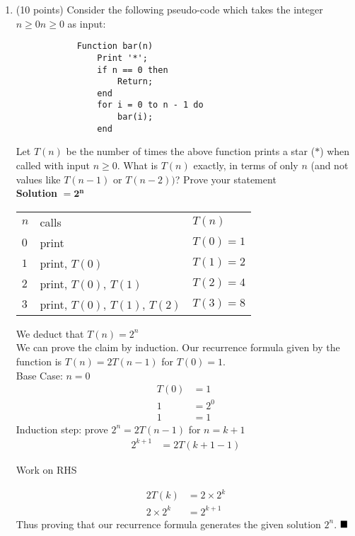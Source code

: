 \documentclass{article}
\begin{document}
    \begin{enumerate}[label=\textbf{Q2}]
        \item (10 points) Consider the following pseudo-code which takes the integer $n \geq 0n \geq 0$ as input:
        \begin{verbatim}
            Function bar(n)
                Print '*';
                if n == 0 then
                    Return;
                end
                for i = 0 to n - 1 do
                    bar(i);
                end
        \end{verbatim}
        Let $T(n)$ be the number of times the above function prints a star ($*$) when called with input $n \geq 0$.
        What is $T(n)$ exactly, in terms of only $n$ (and not values like $T(n - 1)$ or $T(n - 2))$? Prove your
        statement\\[0.25in]
        \textbf{Solution} $= \mathbf{2^n}$\\
        \begin{tabular}{l l l}
            $n$ & calls & $T(n)$\\
            $0$ & print & $T(0) = 1$\\
            $1$ & print, $T(0)$ & $T(1) = 2$\\
            $2$ & print, $T(0)$, $T(1)$ & $T(2) = 4$\\
            $3$ & print, $T(0)$, $T(1)$, $T(2)$ & $T(3) = 8$\\
        \end{tabular}

        We deduct that $T(n) = 2^n$\\
        We can prove the claim by induction. Our recurrence formula given by the function is $T(n) = 2T(n-1)$ for 
        $T(0) = 1$.\\
        Base Case: $n = 0$
        \begin{align*}
            T(0) &= 1\\
            1 &= 2^0\\
            1 &= 1
        \end{align*}
        Induction step: prove $2^n = 2T(n-1)$ for $n = k+1$
        \begin{align*}
            \boxed{2^{k+1}} &= 2T(k+1-1)
        \end{align*}
        \centerline{Work on RHS}
        \begin{align*}
            2T(k) &= 2 \times 2^k\\
            2 \times 2^k &= \boxed{2^{k+1}}
        \end{align*}
        Thus proving that our recurrence formula generates the given solution $2^n$. $\hfill \blacksquare$

    \end{enumerate}
\end{document}
